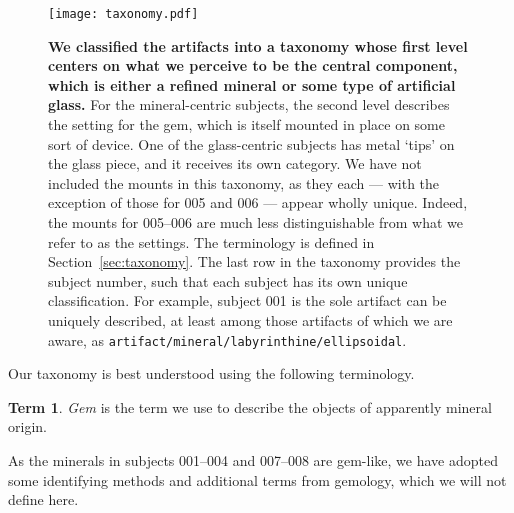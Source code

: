\documentclass[10pt]{article}
\theoremstyle{definition}
\newtheorem{term}{Term}
\begin{document}
\begin{figure}
\texttt{[image: taxonomy.pdf]}
\caption{\label{fig:taxonomy}\textbf{We classified the artifacts into a taxonomy whose first level centers on what we perceive to be the central component, which is either a refined mineral or some type of artificial glass.} For the mineral-centric subjects, the second level describes the setting for the gem, which is itself mounted in place on some sort of device. One of the glass-centric subjects has metal `tips' on the glass piece, and it receives its own category. We have not included the mounts in this taxonomy, as they each --- with the exception of those for 005 and 006 --- appear wholly unique. Indeed, the mounts for 005--006 are much less distinguishable from what we refer to as the settings. The terminology is defined in Section~\ref{sec:taxonomy}. The last row in the taxonomy provides the subject number, such that each subject has its own unique classification. For example, subject 001 is the sole artifact can be uniquely described, at least among those artifacts of which we are aware, as \texttt{artifact/mineral/labyrinthine/ellipsoidal}. }
\end{figure}

Our taxonomy is best understood using the following terminology.

\begin{term}
\emph{Gem} is the term we use to describe the objects of apparently mineral origin.
\end{term}
As the minerals in subjects 001--004 and 007--008 are gem-like, we have adopted some identifying methods and additional terms from gemology, which we will not define here.
\end{document}
